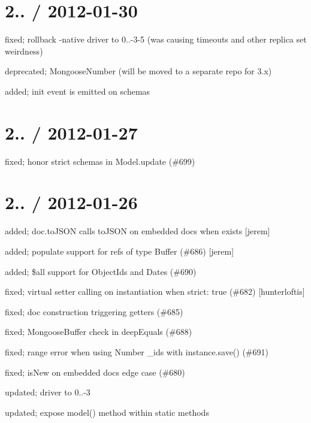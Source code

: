 \section*{2.. / 2012-\/01-\/30 }


\begin{DoxyItemize}
\item fixed; rollback -\/native driver to 0..-\/3-\/5 (was causing timeouts and other replica set weirdness)
\item deprecated; Mongoose\+Number (will be moved to a separate repo for 3.\+x)
\item added; init event is emitted on schemas
\end{DoxyItemize}

\section*{2.. / 2012-\/01-\/27 }


\begin{DoxyItemize}
\item fixed; honor strict schemas in Model.\+update (\#699)
\end{DoxyItemize}

\section*{2.. / 2012-\/01-\/26 }


\begin{DoxyItemize}
\item added; doc.\+to\+J\+S\+ON calls to\+J\+S\+ON on embedded docs when exists \mbox{[}jerem\mbox{]}
\item added; populate support for refs of type Buffer (\#686) \mbox{[}jerem\mbox{]}
\item added; \$all support for Object\+Ids and Dates (\#690)
\item fixed; virtual setter calling on instantiation when strict\+: true (\#682) \mbox{[}hunterloftis\mbox{]}
\item fixed; doc construction triggering getters (\#685)
\item fixed; Mongoose\+Buffer check in deep\+Equals (\#688)
\item fixed; range error when using Number \+\_\+ids with {\ttfamily instance.\+save()} (\#691)
\item fixed; is\+New on embedded docs edge case (\#680)
\item updated; driver to 0..-\/3
\item updated; expose {\ttfamily model()} method within static methods
\end{DoxyItemize}

